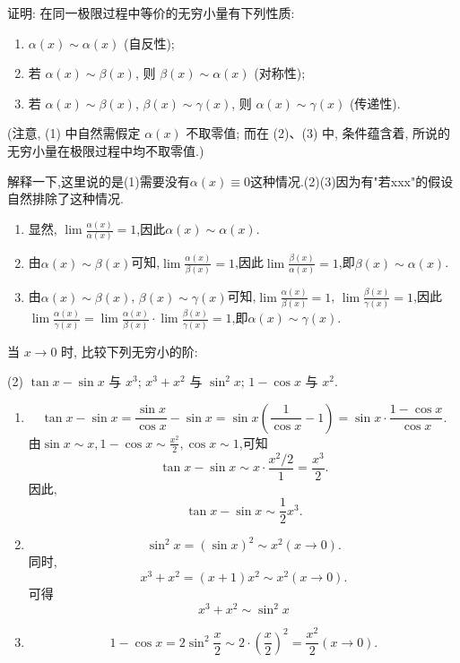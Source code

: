 \begin{exercise}[1.3.15]
    证明: 在同一极限过程中等价的无穷小量有下列性质:
    \begin{enumerate}
        \item $\alpha(x) \sim \alpha(x)$ (自反性);
        \item 若 $\alpha(x) \sim \beta(x)$, 则 $\beta(x) \sim \alpha(x)$ (对称性);
        \item 若 $\alpha(x) \sim \beta(x)$, $\beta(x) \sim \gamma(x)$, 则 $\alpha(x) \sim \gamma(x)$ (传递性).
    \end{enumerate}
    (注意, (1) 中自然需假定 $\alpha(x)$ 不取零值; 而在 (2)、(3) 中, 条件蕴含着, 所说的无穷小量在极限过程中均不取零值.)
\end{exercise}

\begin{solution}
    解释一下,这里说的是(1)需要没有$\alpha(x)\equiv 0$这种情况.(2)(3)因为有"若xxx"的假设自然排除了这种情况.
    \begin{enumerate}[(1)]
        \item 显然, $\lim \frac{\alpha(x)}{\alpha(x)} = 1$,因此$\alpha(x) \sim \alpha(x)$.
        \item 由$\alpha(x) \sim \beta(x)$可知,$\lim \frac{\alpha(x)}{\beta(x)} = 1$,因此$\lim \frac{\beta(x)}{\alpha(x)} = 1$,即$\beta(x) \sim \alpha(x)$.
        \item 由$\alpha(x) \sim \beta(x)$, $\beta(x) \sim \gamma(x)$可知,$\lim \frac{\alpha(x)}{\beta(x)} = 1$, $\lim \frac{\beta(x)}{\gamma(x)} = 1$,因此$\lim \frac{\alpha(x)}{\gamma(x)} = \lim \frac{\alpha(x)}{\beta(x)} \cdot \lim \frac{\beta(x)}{\gamma(x)} = 1$,即$\alpha(x) \sim \gamma(x)$.
    \end{enumerate}
\end{solution}

\begin{exercise}[1.3.16]
    当 $x \to 0$ 时, 比较下列无穷小的阶:
    \begin{tasks}[label=(\arabic*)](2)
        \task $\tan x - \sin x$ 与 $x^3$;
        \task $x^3+x^2$ 与 $\sin^2 x$;
        \task $1-\cos x$ 与 $x^2$.
    \end{tasks}
\end{exercise}

\begin{solution}
    \begin{enumerate}[(1)]
        \item $$\tan x - \sin x = \frac{\sin x}{\cos x} - \sin x = \sin x \left( \frac{1}{\cos x} - 1 \right) = \sin x \cdot \frac{1 - \cos x}{\cos x}.$$
              由$\sin x \sim x, 1 - \cos x \sim \frac{x^2}{2}, \cos x \sim 1$,可知$$\tan x - \sin x \sim x \cdot \frac{x^2 / 2}{1} = \frac{x^3}{2}.$$
              因此,$$\tan x - \sin x \sim \frac{1}{2} x^3.$$
        \item $$\sin^2 x = (\sin x)^2 \sim x^2  (x \to 0).$$
              同时,$$x^3 + x^2=(x+1)x^2\sim x^2   (x \to 0).$$
              可得$$x^3 + x^2\sim \sin^2 x$$
        \item $$1 - \cos x = 2 \sin^2 \frac{x}{2} \sim 2 \cdot \left( \frac{x}{2} \right)^2 = \frac{x^2}{2} (x \to 0).$$
    \end{enumerate}
\end{solution}

